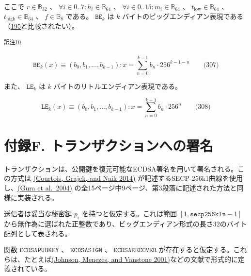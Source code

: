\documentclass[
]{ltjsarticle}
\begin{document}
ここで \(r \in \mathbb{B}_{32}\) 、
\(\forall i \in 0..7: h_i \in \mathbb{B}_{64}\) 、
\(\forall i \in 0..15: m_i \in \mathbb{B}_{64}\) 、
\(t_\mathrm{low} \in \mathbb{B}_{64}\) 、
\(t_\mathrm{high} \in \mathbb{B}_{64}\) 、 \(f \in \mathbb{B}_8\)
である。 \(\mathtt{BE}_k\) は \(k\)
バイトのビッグエンディアン表現である（\protect\hyperlink{eq:BE}{195}と比較されたい）。

\protect\hypertarget{tnref-10}{}{}\textsuperscript{\protect\hyperlink{tn-10}{訳注10}}

\protect\hypertarget{eq-307}{}{}

\[\mathtt{BE}_k(x) \equiv (b_0, b_1, ..., b_{k-1}): x = \sum_{n = 0}^{k-1} b_n \cdot 256^{k-1-n} \qquad \text{(307)}\]

また、 \(\mathtt{LE}_k\) は \(k\) バイトのリトルエンディアン表現である。

\protect\hypertarget{eq-308}{}{}

\[\mathtt{LE}_k(x) \equiv (b_0, b_1, ..., b_{k-1}): x = \sum_{n = 0}^{k-1} b_n \cdot 256^n \qquad \text{(308)}\]

\protect\hypertarget{app:signing}{}{}

\hypertarget{ux4ed8ux9332f.-ux30c8ux30e9ux30f3ux30b6ux30afux30b7ux30e7ux30f3ux3078ux306eux7f72ux540d}{%
\section{付録F.
トランザクションへの署名}\label{ux4ed8ux9332f.-ux30c8ux30e9ux30f3ux30b6ux30afux30b7ux30e7ux30f3ux3078ux306eux7f72ux540d}}

トランザクションは、公開鍵を復元可能なECDSA署名を用いて署名される。この方式は
\protect\hyperlink{ref-Courtois2014}{(Courtois, Grajek, and Naik 2014)}
が記述するSECP-256k1曲線を使用し、\protect\hyperlink{ref-gura2004comparing}{(Gura
et al.~2004)}
の全15ページ中9ページ、第3段落に記述された方法と同様に実装される。

送信者は妥当な秘密鍵 \(p_{\mathrm{r}}\) を持つと仮定する。これは範囲
\([1, \mathtt{secp256k1n} - 1]\)
から無作為に選ばれた正整数であり、ビッグエンディアン形式の長さ32のバイト配列として表される。

関数 \(\mathtt{ECDSAPUBKEY}\) 、 \(\mathtt{ECDSASIGN}\) 、
\(\mathtt{ECDSARECOVER}\)
が存在すると仮定する。これらは、たとえば\protect\hyperlink{ref-ECDSAcerticom}{(Johnson,
Menezes, and Vanstone 2001)}などの文献で形式的に定義されている。

\protect\hypertarget{eq-309}{}{}\protect\hypertarget{eq-310}{}{}\protect\hypertarget{eq-311}{}{}
\end{document}
